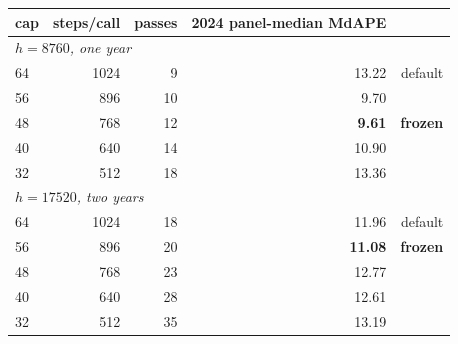 \begin{tabular}{lrrrr}
\toprule
cap & steps/call & passes & 2024 panel-median MdAPE & \\
\midrule
\multicolumn{5}{l}{\emph{$h=8760$, one year}} \\
64 & 1024 & 9 & 13.22 & default \\
56 & 896 & 10 & 9.70 & \\
48 & 768 & 12 & \textbf{9.61} & \textbf{frozen} \\
40 & 640 & 14 & 10.90 & \\
32 & 512 & 18 & 13.36 & \\
\midrule
\multicolumn{5}{l}{\emph{$h=17520$, two years}} \\
64 & 1024 & 18 & 11.96 & default \\
56 & 896 & 20 & \textbf{11.08} & \textbf{frozen} \\
48 & 768 & 23 & 12.77 & \\
40 & 640 & 28 & 12.61 & \\
32 & 512 & 35 & 13.19 & \\
\bottomrule
\end{tabular}

